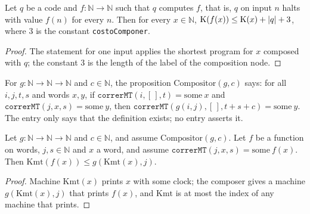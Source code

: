 \begin{theorem}
  \label{thm:information-no-crece}
  \leanok
  Let $q$ be a code and $f : \mathbb{N} \to \mathbb{N}$ such that $q$ computes $f$, that is,
  $q$ on input $n$ halts with value $f(n)$ for every $n$. Then for every $x \in \mathbb{N}$,
  $\mathrm{K}(f(x)) \le \mathrm{K}(x) + |q| + 3$, where $3$ is the constant \texttt{costoComponer}.
  \own{}
\end{theorem}

\begin{proof}
  \leanok
  The statement for one input applies the shortest program for $x$ composed with $q$; the
  constant $3$ is the length of the label of the composition node.
\end{proof}

\begin{definition}
  \label{def:information-compositor}
  \leanok
  For $g : \mathbb{N} \to \mathbb{N} \to \mathbb{N}$ and $c \in \mathbb{N}$, the proposition
  $\mathrm{Compositor}(g, c)$ says: for all $i, j, t, s$ and words $x, y$, if
  $\texttt{correrMT}(i, [\,], t) = \mathrm{some}\ x$ and $\texttt{correrMT}(j, x, s) =
  \mathrm{some}\ y$, then $\texttt{correrMT}(g(i,j), [\,], t + s + c) = \mathrm{some}\ y$. The
  entry only says that the definition exists; no entry asserts it.
  \own{}
\end{definition}

\begin{theorem}
  \label{thm:information-no-creation-mt}
  \leanok
  Let $g : \mathbb{N} \to \mathbb{N} \to \mathbb{N}$ and $c \in \mathbb{N}$, and assume
  $\mathrm{Compositor}(g, c)$. Let $f$ be a function on words, $j, s \in \mathbb{N}$ and $x$ a word,
  and assume $\texttt{correrMT}(j, x, s) = \mathrm{some}\ f(x)$. Then
  $\mathrm{Kmt}(f(x)) \le g(\mathrm{Kmt}(x), j)$.
  \own{}
\end{theorem}

\begin{proof}
  \leanok
  Machine $\mathrm{Kmt}(x)$ prints $x$ with some clock; the composer gives a machine $g(\mathrm{Kmt}(x), j)$
  that prints $f(x)$, and $\mathrm{Kmt}$ is at most the index of any machine that prints.
\end{proof}

